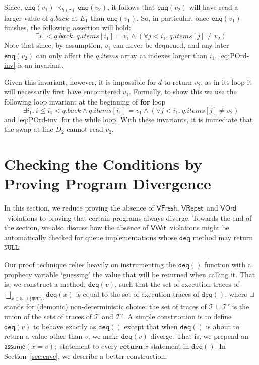 \documentclass{LMCS}
\newcommand{\NULL}{\ensuremath{\mathtt{NULL}}}
\newcommand{\enq}{\ensuremath{\mathtt{enq}}}
\newcommand{\deq}{\ensuremath{\mathtt{deq}}}
\newcommand{\ndchoice}{\sqcup}
\newcommand{\bigndchoice}{\bigsqcup}
\newcommand{\VFresh}{\ensuremath{\mathsf{VFresh}}}
\newcommand{\VRepet}{\ensuremath{\mathsf{VRepet}}}
\newcommand{\VOrd}{\ensuremath{\mathsf{VOrd}}}
\newcommand{\VWit}{\ensuremath{\mathsf{VWit}}}
\begin{document}
Since, $\enq(v_1) \prec_{h(\tau)} \enq(v_2)$, it follows that $\enq(v_2)$ will have read a larger
value of $q.back$ at $E_1$ than $\enq(v_1)$.  So, in particular, once $\enq(v_1)$
finishes, the following assertion will hold:
\begin{equation}
\tag{$*$}\label{eq:POrd-inv}
    \exists i_1 < q.back.~ q.items[i_1] = v_1 \land (\forall j < i_1.~ q.items[j] \neq v_2) 
\end{equation}
Note that since, by assumption, $v_1$ can never be dequeued, and any later
$\enq(v_2)$ can only affect the $q.items$ array at indexes larger than $i_1$,
\eqref{eq:POrd-inv} is an invariant.

Given this invariant, however, it is impossible for $d$ to return $v_2$, as in
its loop it will necessarily first have encountered $v_1$. Formally, to show this
we use the following loop invariant at the beginning of $\mathbf{for}$ loop
\[
      \exists i_1.~  i \leq i_1 < q.back \land q.items[i_1] = v_1 \land (\forall j < i_1.~ q.items[j] \neq v_2) 
\]
and \eqref{eq:POrd-inv} for the while loop. With these invariants, it is immediate
that the swap at line $D_2$ cannot read $v_2$.

\section{Checking the Conditions by Proving Program Divergence}
\label{sec:checking}

In this section, we reduce proving the absence of \VFresh, \VRepet\ and \VOrd\
violations to proving that certain programs always diverge.  Towards the end of
the section, we also discuss how the absence of \VWit\ violations might be automatically
checked for queue implementations whose {\deq} method may return \NULL.

Our proof technique relies heavily on instrumenting the $\deq()$ function
with a prophecy variable `guessing' the value that will be returned when
calling it.
That is, we construct a method, $\deq(v)$, such that the set of execution traces of
$\bigndchoice_{x \in \mathbb{N}\cup\{\NULL\}} \deq(x)$ 
is equal to the set of execution traces of $\deq()$, where $\ndchoice$ stands for
(demonic) non-deterministic choice: the set of traces of $\mathcal{T} \sqcup \mathcal{T}'$ is
the union of the sets of traces of $\mathcal{T}$ and $\mathcal{T}'$.
A simple construction is to define $\deq(v)$ to behave exactly as $\deq()$
except that when $\deq()$ is about to return a value other than $v$, 
we make $\deq(v)$ diverge.  That is, we prepend an $\mathsf{assume}(x = v);$
statement to every $\mathbf{return}\ x$ statement in $\deq()$.
In Section~\ref{sec:cave}, we describe a better construction.
\end{document}
